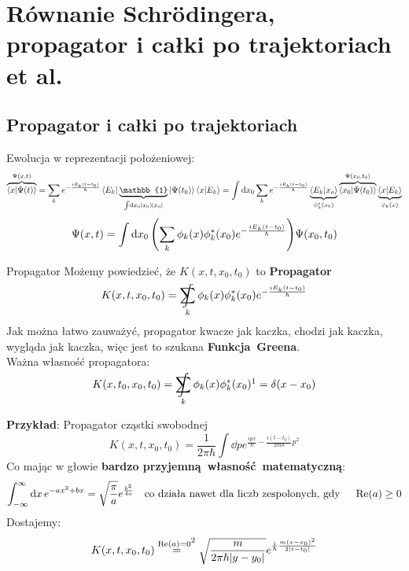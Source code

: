 \documentclass[12pt,a4paper]{report}
\newcommand{\subind}[2]{{\color{blue} #1\index{#2}}}
\newcommand{\Id}{\mathbb{1}}
\renewcommand{\emph}{\textbf}
\newenvironment{lecture}[1]{\par\medskip
   \noindent\chapter{#1} \rmfamily}{\medskip}
\newenvironment{emph_box}[1]
    {\begin{center}\color{BrickRed}
    \begin{tabular}{|p{0.9\textwidth}|}
    \hline
    \begin{center} \color{Dandelion}{\textbf{#1}} \end{center}
    \begin{center}
    }
    {
    \end{center}
    \\\\\hline
    \end{tabular} 
    \end{center}
    \color{black}
    }
\DeclareMathOperator*{\SumInt}{%
\mathchoice%
  {\ooalign{$\displaystyle\sum$\cr\hidewidth$\displaystyle\int$\hidewidth\cr}}
  {\ooalign{\raisebox{.14\height}{\scalebox{.7}{$\textstyle\sum$}}\cr\hidewidth$\textstyle\int$\hidewidth\cr}}
  {\ooalign{\raisebox{.2\height}{\scalebox{.6}{$\scriptstyle\sum$}}\cr$\scriptstyle\int$\cr}}
  {\ooalign{\raisebox{.2\height}{\scalebox{.6}{$\scriptstyle\sum$}}\cr$\scriptstyle\int$\cr}}
}
\begin{document}
\begin{lecture}{Równanie Schrödingera, propagator i całki po trajektoriach et al.}
\section{Propagator i całki po trajektoriach}
Ewolucja w reprezentacji położeniowej:
\[
    \overbrace{\braket{x}{\Psi(t)}}^{\Psi(x,t)} = \sum_k e^{- \frac{i E_k (t- t_0)}{\hbar}} \bra{E_k} \underbrace{\Id}_{\int \dd{x_0} \ketbra{x_0}} \ket{\Psi(t_0)} \braket{x}{E_k} = \int \dd{x_0} \sum_k e^{- \frac{i E_k (t- t_0)}{\hbar}} \underbrace{\braket{E_k}{x_o}}_{\phi^\ast_k(x_0)} \overbrace{\braket{x_0}{\Psi(t_0)}}^{\Psi(x_0, t_0)} \underbrace{\braket{x}{E_k}}_{\phi_k(x)}
\]
\[
    \Psi(x, t) = \int \dd{x_0} \qty(\sum_k \phi_k(x) \phi_k^\ast(x_0) e^{- \frac{i E_k (t-t_0)}{\hbar}}) \Psi(x_0, t_0)
\]
\begin{emph_box}{\subind{Propagator}{Funkcja!Greena} }
Możemy powiedzieć, że $K(x, t, x_0, t_0)$ to \emph{Propagator}
\begin{equation}
    K(x, t, x_0, t_0) = \SumInt_k \phi_k(x) \phi_k^\ast(x_0) e^{- \frac{i E_k (t-t_0)}{\hbar}}
    \label{eq:lec_5:propagator}
\end{equation}
Jak można łatwo zauważyć, propagator kwacze jak kaczka, chodzi jak kaczka, wygląda jak kaczka, więc jest to szukana \emph{Funkcja Greena}\footnotemark.\\

Ważna własność propagatora:
\[
    K(x, t_0, x_0, t_0) = \SumInt_k \phi_k(x) \phi_k^\ast(x_0)\footnotemark = \delta(x-x_0)
\]
\end{emph_box}
\addtocounter{footnote}{-1}
\emph{Przykład}: Propagator cząstki swobodnej\\
\[
    K(x, t, x_0, t_0) = \frac{1}{2 \pi \hbar} \int \dd{p} e^{\frac{i p x}{\hbar} - \frac{i (t - t_0)}{2 m \hbar}p^2}
\]
Co mając w głowie \emph{bardzo przyjemną własność matematyczną}:
\[
    \int_{-\infty}^{\infty} \dd{x} e^{-ax^2 + bx} = \sqrt{\frac{\pi}{a}} e^{\frac{b^2}{4 a}} \qq{co działa nawet dla liczb zespolonych, gdy }\Re(a)\geq0
\]
Dostajemy:
\[
    K(x, t, x_0, t_0) \stackrel{\Re(a) = 0\footnotemark}{=} \sqrt{\frac{m}{2 \pi \hbar \qty|y - y_0|}} e^{\frac{i}{\hbar} \frac{m (x - x_0)^2}{2 \qty|t-t_0|}}
\]

\end{lecture}
\end{document}
